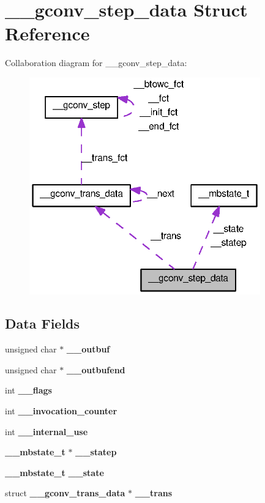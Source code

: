 \section{\_\-\_\-gconv\_\-step\_\-data Struct Reference}
\label{struct____gconv__step__data}


Collaboration diagram for \_\-\_\-gconv\_\-step\_\-data:
\nopagebreak
\begin{figure}[H]
\begin{center}
\leavevmode
\includegraphics[width=283pt]{struct____gconv__step__data__coll__graph}
\end{center}
\end{figure}
\subsection*{Data Fields}
\begin{DoxyCompactItemize}
\item 
unsigned char $\ast$ {\bf \_\-\_\-outbuf}
\item 
unsigned char $\ast$ {\bf \_\-\_\-outbufend}
\item 
int {\bf \_\-\_\-flags}
\item 
int {\bf \_\-\_\-invocation\_\-counter}
\item 
int {\bf \_\-\_\-internal\_\-use}
\item 
{\bf \_\-\_\-mbstate\_\-t} $\ast$ {\bf \_\-\_\-statep}
\item 
{\bf \_\-\_\-mbstate\_\-t} {\bf \_\-\_\-state}
\item 
struct {\bf \_\-\_\-gconv\_\-trans\_\-data} $\ast$ {\bf \_\-\_\-trans}
\end{DoxyCompactItemize}


